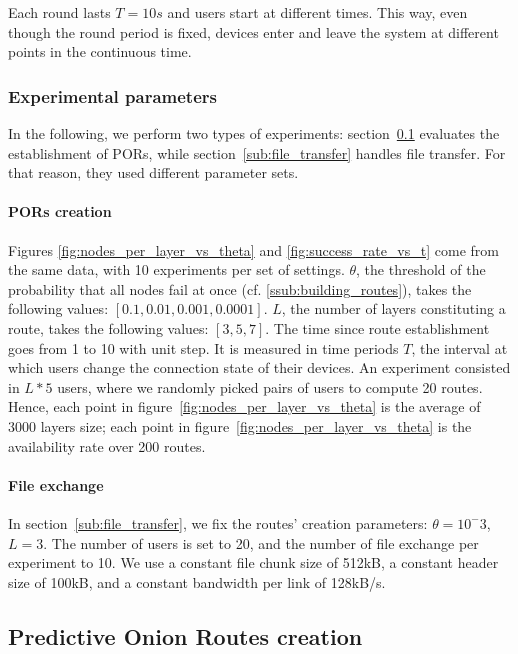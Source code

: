 Each round lasts $T=10s$ and users start at different times. 
This way, even though the round period is fixed, devices enter and leave the system at different points in the continuous time.


\subsubsection{Experimental parameters} %
\label{ssub:experimental_parameters}

In the following, we perform two types of experiments: 
section~\ref{sub:predictive_onion_routes_creation} evaluates the establishment of PORs, while section~\ref{sub:file_transfer} handles file transfer.
For that reason, they used different parameter sets.


\paragraph*{PORs creation}
Figures \ref{fig:nodes_per_layer_vs_theta} and \ref{fig:success_rate_vs_t} come from the same data, with 10 experiments per set of settings.
$\theta$, the threshold of the probability that all nodes fail at once (cf. \ref{ssub:building_routes}), takes the following values: $[0.1, 0.01, 0.001, 0.0001]$.
$L$, the number of layers constituting a route, takes the following values: $[3, 5, 7]$.
The time since route establishment goes from 1 to 10 with  unit step.
It is measured in time periods $T$, the interval at which users change the connection state of their devices.
An experiment consisted in $L*5$ users, where we randomly picked pairs of users to compute 20 routes.
Hence, each point in figure~\ref{fig:nodes_per_layer_vs_theta} is the average of 3000 layers size; 
each point in figure~\ref{fig:nodes_per_layer_vs_theta} is the availability rate over 200 routes.


\paragraph*{File exchange}
In section~\ref{sub:file_transfer}, we fix the routes' creation parameters: $\theta=10^-3$, $L=3$.
The number of users is set to 20, and the number of file exchange per experiment to 10.
We use a constant file chunk size of 512kB, a constant header size of 100kB, and a constant bandwidth per link of 128kB/s.

\subsection{Predictive Onion Routes creation} %
\label{sub:predictive_onion_routes_creation}


